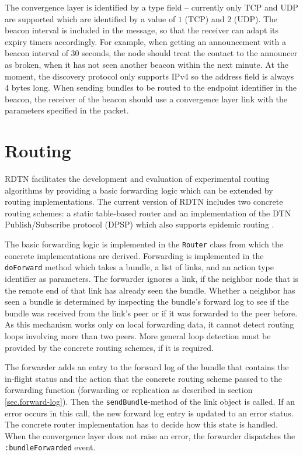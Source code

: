 \documentclass[a4paper]{article}
\begin{document}
The convergence layer is identified by a type field -- currently only TCP and
UDP are supported which are identified by a value of $1$ (TCP) and $2$ (UDP).
The beacon interval is included in the message, so that the receiver can adapt
its expiry timers accordingly. For example, when getting an announcement with a
beacon interval of $30$ seconds, the node should treat the contact to the
announcer as broken, when it has not seen another beacon within the next minute.
At the moment, the discovery protocol only supports IPv4 so the address field is
always 4 bytes long. When sending bundles to be routed to the endpoint
identifier in the beacon, the receiver of the beacon should use a convergence
layer link with the parameters specified in the packet.

\section{Routing}\label{sec.routing}

RDTN facilitates the development and evaluation of experimental routing
algorithms by providing a basic forwarding logic which can be extended by
routing implementations. The current version of RDTN includes two concrete
routing schemes: a static table-based router and an implementation of the DTN
Publish/Subscribe protocol (DPSP) \cite{dtn-pubsub} which also supports epidemic
routing \cite{epidemic}.

The basic forwarding logic is implemented in the {\tt Router} class from which
the concrete implementations are derived. Forwarding is implemented in the {\tt
doForward} method which takes a bundle, a list of links, and an action type
identifier as parameters. The forwarder ignores a link, if the neighbor node
that is the remote end of that link has already seen the bundle. Whether a
neighbor has seen a bundle is determined by inspecting the bundle's forward log
to see if the bundle was received from the link's peer or if it was forwarded
to the peer before. As this mechanism works only on local forwarding data, it
cannot detect routing loops involving more than two peers.  More general loop
detection must be provided by the concrete routing schemes, if it is required.

The forwarder adds an entry to the forward log of the bundle that contains the
in-flight status and the action that the concrete routing scheme passed to
the forwarding function (forwarding or replication as described in section
\ref{sec.forward-log}). Then the {\tt sendBundle}-method of the link object
is called. If an error occurs in this call, the new forward log entry is updated
to an error status. The concrete router implementation has to decide how this
state is handled. When the convergence layer does not raise an error, the
forwarder dispatches the {\tt :bundleForwarded} event.
\end{document}

